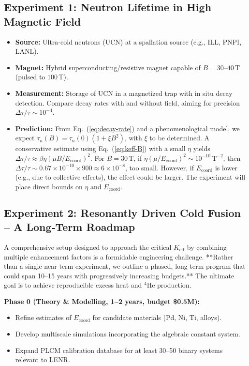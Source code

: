 \documentclass[12pt]{article}
\theoremstyle{remark}
\newcommand{\Keff}{K_{\mathrm{eff}}}
\begin{document}
	\subsection{Experiment 1: Neutron Lifetime in High Magnetic Field}
	
	\begin{itemize}
		\item \textbf{Source:} Ultra‑cold neutrons (UCN) at a spallation source (e.g., ILL, PNPI, LANL).
		\item \textbf{Magnet:} Hybrid superconducting/resistive magnet capable of \(B = 30\)–\(40\,\text{T}\) (pulsed to \(100\,\text{T}\)).
		\item \textbf{Measurement:} Storage of UCN in a magnetized trap with in situ decay detection. Compare decay rates with and without field, aiming for precision \(\Delta \tau / \tau \sim 10^{-4}\).
		\item \textbf{Prediction:} From Eq.~(\ref{eq:decay-rate}) and a phenomenological model, we expect \(\tau_n(B) = \tau_n(0) (1 + \xi B^2)\), with \(\xi\) to be determined. A conservative estimate using Eq.~(\ref{eq:keff-B}) with a small \(\eta\) yields \(\Delta \tau/\tau \approx \beta \eta (\mu B/E_{\mathrm{coord}})^2\). For \(B = 30\,\text{T}\), if \(\eta (\mu/E_{\mathrm{coord}})^2 \sim 10^{-10}\,\text{T}^{-2}\), then \(\Delta \tau/\tau \sim 0.67 \times 10^{-10} \times 900 \approx 6\times10^{-8}\), too small. However, if \(E_{\mathrm{coord}}\) is lower (e.g., due to collective effects), the effect could be larger. The experiment will place direct bounds on \(\eta\) and \(E_{\mathrm{coord}}\).
	\end{itemize}
	
	\subsection{Experiment 2: Resonantly Driven Cold Fusion – A Long‑Term Roadmap}
	
	A comprehensive setup designed to approach the critical \(\Keff\) by combining multiple enhancement factors is a formidable engineering challenge. **Rather than a single near‑term experiment, we outline a phased, long‑term program that could span 10–15 years with progressively increasing budgets.** The ultimate goal is to achieve reproducible excess heat and \(^4\)He production.
	
	\textbf{Phase 0 (Theory \& Modelling, 1–2 years, budget \$0.5M):}
	\begin{itemize}
		\item Refine estimates of \(E_{\mathrm{coord}}\) for candidate materials (Pd, Ni, Ti, alloys).
		\item Develop multiscale simulations incorporating the algebraic constant system.
		\item Expand PLCM calibration database for at least 30–50 binary systems relevant to LENR.
	\end{itemize}
	
\end{document}
